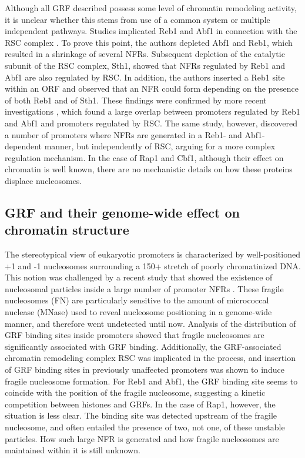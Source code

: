 Although all GRF described possess some level of chromatin remodeling activity, it is unclear whether this stems from use of a common system or multiple independent pathways. 
Studies implicated Reb1 and Abf1 in connection with the RSC complex \cite{hartley:2009:mechanisms}. 
To prove this point, the authors depleted Abf1 and Reb1, which resulted in a shrinkage of several NFRs.
Subsequent depletion of the catalytic subunit of the RSC complex, Sth1, showed that NFRs regulated by Reb1 and Abf1 are also regulated by RSC. 
In addition, the authors inserted a Reb1 site within an ORF and observed that an NFR could form depending on the presence of both Reb1 and of Sth1. 
These findings were confirmed by more recent investigations \cite{kubik:2015:nucleosome}, which found a large overlap between promoters regulated by Reb1 and Abf1 and promoters regulated by RSC. 
The same study, however, discovered a number of promoters where NFRs are generated in a Reb1- and Abf1-dependent manner, but independently of RSC, arguing for a more complex regulation mechanism. 
In the case of Rap1 and Cbf1, although their effect on chromatin is well known, there are no mechanistic details on how these proteins displace nucleosomes. 


\subsection{GRF and their genome-wide effect on chromatin structure}

The stereotypical view of eukaryotic promoters is characterized by well-positioned +1 and -1 nucleosomes surrounding a 150+ stretch of poorly chromatinized DNA. 
This notion was challenged by a recent study that showed the existence of nucleosomal particles inside a large number of promoter NFRs \cite{kubik:2015:nucleosome}. 
These fragile nucleosomes (FN) are particularly sensitive to the amount of micrococcal nuclease (MNase) used to reveal nucleosome positioning in a genome-wide manner, and therefore went undetected until now. 
Analysis of the distribution of GRF binding sites inside promoters showed that fragile nucleosomes are significantly associated with GRF binding. 
Additionally, the GRF-associated chromatin remodeling complex RSC was implicated in the process, and insertion of GRF binding sites in previously unaffected promoters was shown to induce fragile nucleosome formation. 
For Reb1 and Abf1, the GRF binding site seems to coincide with the position of the fragile nucleosome, suggesting a kinetic competition between histones and GRFs. 
In the case of Rap1, however, the situation is less clear. The binding site was detected upstream of the fragile nucleosome, and often entailed the presence of two, not one, of these unstable particles. 
How such large NFR is generated and how fragile nucleosomes are maintained within it is still unknown. 



